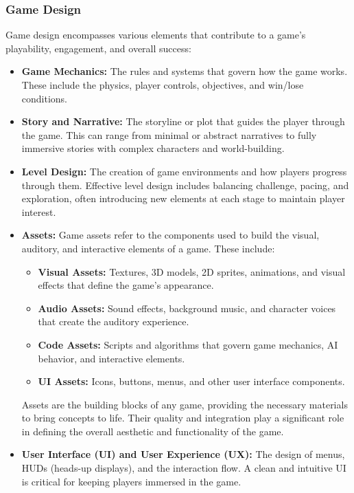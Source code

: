 \documentclass[12pt,oneside,openright,a4paper]{cpe-english-project}
\begin{document}
\subsubsection{Game Design}
Game design encompasses various elements that contribute to a game’s playability, engagement, and overall success:
\begin{itemize}
\item  \textbf{Game Mechanics:}
The rules and systems that govern how the game works. These include the physics, player controls, objectives, and win/lose conditions.
\item  \textbf{Story and Narrative:}
The storyline or plot that guides the player through the game. This can range from minimal or abstract narratives to fully immersive stories with complex characters and world-building.
\item  \textbf{Level Design:}
The creation of game environments and how players progress through them. Effective level design includes balancing challenge, pacing, and exploration, often introducing new elements at each stage to maintain player interest.
\item  \textbf{Assets:}
Game assets refer to the components used to build the visual, auditory, and interactive elements of a game. These include:
\begin{itemize}
\item  \textbf{Visual Assets:} Textures, 3D models, 2D sprites, animations, and visual effects that define the game's appearance.
\item  \textbf{Audio Assets:} Sound effects, background music, and character voices that create the auditory experience.
\item  \textbf{Code Assets:} Scripts and algorithms that govern game mechanics, AI behavior, and interactive elements.
\item  \textbf{UI Assets:} Icons, buttons, menus, and other user interface components.
\end{itemize}
Assets are the building blocks of any game, providing the necessary materials to bring concepts to life. Their quality and integration play a significant role in defining the overall aesthetic and functionality of the game.
\item  \textbf{User Interface (UI) and User Experience (UX):}
The design of menus, HUDs (heads-up displays), and the interaction flow. A clean and intuitive UI is critical for keeping players immersed in the game.
\end{itemize}
\end{document}
